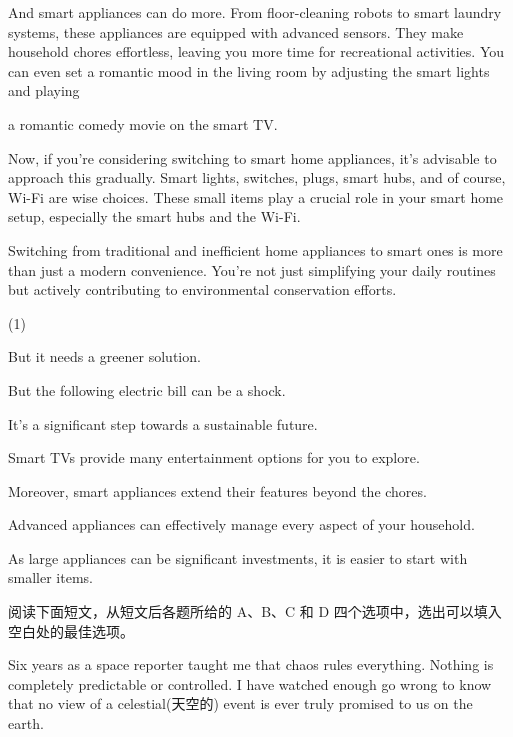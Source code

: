 \documentclass{英语试卷}
\begin{document}
\par And smart appliances can do more. From floor-cleaning robots to smart laundry systems, these appliances are equipped with advanced sensors. They make household chores effortless, leaving you more time for recreational activities.  You can even set a romantic mood in the living room by adjusting the smart lights and playing\par
\par a romantic comedy movie on the smart TV.\par
\par Now, if you're considering switching to smart home appliances, it's advisable to approach this gradually.  Smart lights, switches, plugs, smart hubs, and of course, Wi-Fi are wise choices. These small items play a crucial role in your smart home setup, especially the smart hubs and the Wi-Fi.\par
\par Switching from traditional and inefficient home appliances to smart ones is more than just a modern convenience.  You're not just simplifying your daily routines but actively contributing to environmental conservation efforts.\par
\begin{choices}(1)
  \item But it needs a greener solution.
  \item But the following electric bill can be a shock.
  \item It's a significant step towards a sustainable future.
  \item Smart TVs provide many entertainment options for you to explore.
  \item Moreover, smart appliances extend their features beyond the chores.
  \item Advanced appliances can effectively manage every aspect of your household.
  \item As large appliances can be significant investments, it is easier to start with smaller items.
\end{choices}
\par 阅读下面短文，从短文后各题所给的 A、B、C 和 D 四个选项中，选出可以填入空白处的最佳选项。\par
\par Six years as a space reporter taught me that chaos rules everything. Nothing is completely predictable or controlled. I have watched enough go wrong to know that no view of a celestial(天空的) event is ever truly promised to us  on the earth.\par
\end{document}
